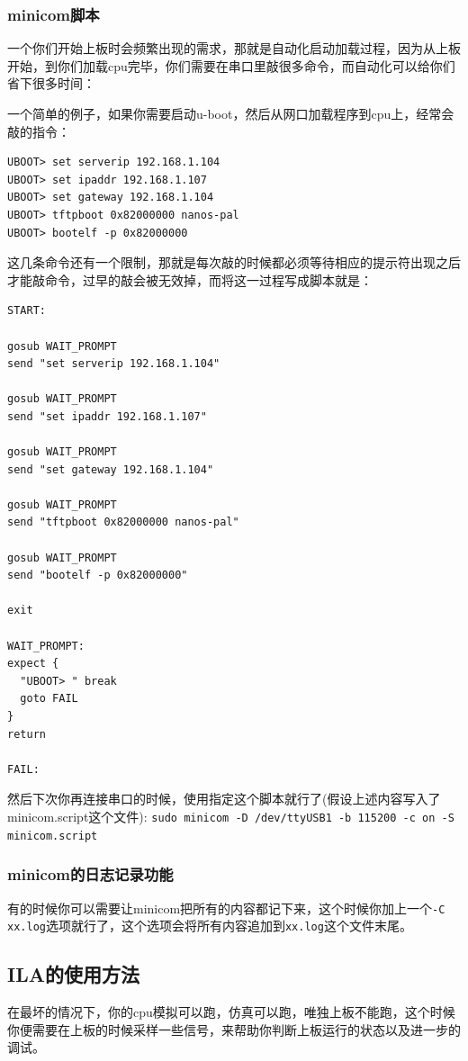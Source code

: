 \documentclass[lang=cn,11pt,a4paper]{elegantpaper}
\begin{document}
\subsubsection{minicom脚本}
一个你们开始上板时会频繁出现的需求，那就是自动化启动加载过程，因为从上板开始，到你们加载cpu完毕，你们需要在串口里敲很多命令，而自动化可以给你们省下很多时间：

一个简单的例子，如果你需要启动u-boot，然后从网口加载程序到cpu上，经常会敲的指令：
\begin{lstlisting}
UBOOT> set serverip 192.168.1.104
UBOOT> set ipaddr 192.168.1.107
UBOOT> set gateway 192.168.1.104
UBOOT> tftpboot 0x82000000 nanos-pal
UBOOT> bootelf -p 0x82000000
\end{lstlisting}
这几条命令还有一个限制，那就是每次敲的时候都必须等待相应的提示符出现之后才能敲命令，过早的敲会被无效掉，而将这一过程写成脚本就是：
\begin{lstlisting}
START:

gosub WAIT_PROMPT
send "set serverip 192.168.1.104"

gosub WAIT_PROMPT
send "set ipaddr 192.168.1.107"

gosub WAIT_PROMPT
send "set gateway 192.168.1.104"

gosub WAIT_PROMPT
send "tftpboot 0x82000000 nanos-pal"

gosub WAIT_PROMPT
send "bootelf -p 0x82000000"

exit

WAIT_PROMPT:
expect {
  "UBOOT> " break
  goto FAIL
}
return

FAIL:
\end{lstlisting}
然后下次你再连接串口的时候，使用指定这个脚本就行了(假设上述内容写入了minicom.script这个文件): \lstinline!sudo minicom -D /dev/ttyUSB1 -b 115200 -c on -S minicom.script!

\subsubsection{minicom的日志记录功能}
有的时候你可以需要让minicom把所有的内容都记下来，这个时候你加上一个\lstinline!-C xx.log!选项就行了，这个选项会将所有内容追加到\lstinline!xx.log!这个文件末尾。

\subsection{ILA的使用方法}

在最坏的情况下，你的cpu模拟可以跑，仿真可以跑，唯独上板不能跑，这个时候你便需要在上板的时候采样一些信号，来帮助你判断上板运行的状态以及进一步的调试。
\end{document}

